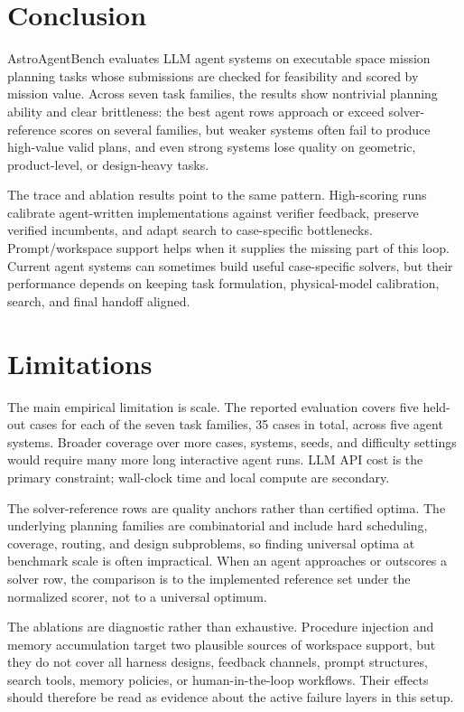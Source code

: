 \documentclass[]{mosi}
\begin{document}
\section{Conclusion}
\label{sec:conclusion}

AstroAgentBench evaluates LLM agent systems on executable space mission planning tasks whose submissions are checked for feasibility and scored by mission value. Across seven task families, the results show nontrivial planning ability and clear brittleness: the best agent rows approach or exceed solver-reference scores on several families, but weaker systems often fail to produce high-value valid plans, and even strong systems lose quality on geometric, product-level, or design-heavy tasks.

The trace and ablation results point to the same pattern. High-scoring runs calibrate agent-written implementations against verifier feedback, preserve verified incumbents, and adapt search to case-specific bottlenecks. Prompt/workspace support helps when it supplies the missing part of this loop. Current agent systems can sometimes build useful case-specific solvers, but their performance depends on keeping task formulation, physical-model calibration, search, and final handoff aligned.

\section*{Limitations}

The main empirical limitation is scale. The reported evaluation covers five held-out cases for each of the seven task families, 35 cases in total, across five agent systems. Broader coverage over more cases, systems, seeds, and difficulty settings would require many more long interactive agent runs. LLM API cost is the primary constraint; wall-clock time and local compute are secondary.

The solver-reference rows are quality anchors rather than certified optima. The underlying planning families are combinatorial and include hard scheduling, coverage, routing, and design subproblems, so finding universal optima at benchmark scale is often impractical. When an agent approaches or outscores a solver row, the comparison is to the implemented reference set under the normalized scorer, not to a universal optimum.

The ablations are diagnostic rather than exhaustive. Procedure injection and memory accumulation target two plausible sources of workspace support, but they do not cover all harness designs, feedback channels, prompt structures, search tools, memory policies, or human-in-the-loop workflows. Their effects should therefore be read as evidence about the active failure layers in this setup.
\end{document}

